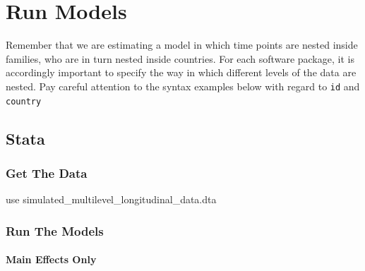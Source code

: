 \documentclass[
  letterpaper,
  DIV=11,
  numbers=noendperiod]{scrreprt}
\let\oldparagraph\paragraph
\renewcommand{\paragraph}[1]{\oldparagraph{#1}\mbox{}}
\newenvironment{Shaded}{\begin{snugshade}}{\end{snugshade}}
\newcommand{\KeywordTok}[1]{\textcolor[rgb]{0.00,0.23,0.31}{#1}}
\newcommand{\NormalTok}[1]{\textcolor[rgb]{0.00,0.23,0.31}{#1}}
\begin{document}
\section{Run Models}\label{run-models-3}

\begin{tcolorbox}[enhanced jigsaw, colback=white, left=2mm, arc=.35mm, breakable, colbacktitle=quarto-callout-warning-color!10!white, colframe=quarto-callout-warning-color-frame, leftrule=.75mm, opacityback=0, titlerule=0mm, title=\textcolor{quarto-callout-warning-color}{\faExclamationTriangle}\hspace{0.5em}{Warning}, toptitle=1mm, toprule=.15mm, bottomrule=.15mm, bottomtitle=1mm, rightrule=.15mm, opacitybacktitle=0.6, coltitle=black]

Remember that we are estimating a model in which time points are nested
inside families, who are in turn nested inside countries. For each
software package, it is accordingly important to specify the way in
which different levels of the data are nested. Pay careful attention to
the syntax examples below with regard to \texttt{id} and
\texttt{country}

\end{tcolorbox}

\subsection{Stata}

\subsubsection{Get The Data}\label{get-the-data-3}

\begin{Shaded}
\begin{Highlighting}[]

\KeywordTok{use}\NormalTok{ simulated\_multilevel\_longitudinal\_data.dta}
\end{Highlighting}
\end{Shaded}

\subsubsection{Run The Models}\label{run-the-models}

\paragraph{Main Effects Only}\label{main-effects-only}
\end{document}
